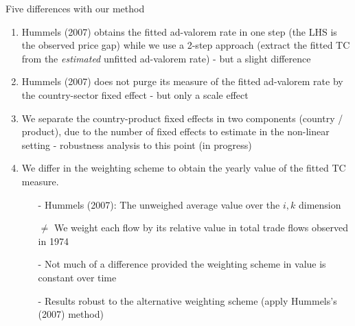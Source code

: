 \documentclass[10 pt,Helvetica, french]{beamer}
\begin{document}
\begin{frame}[label = app_compeffects_Hummels2]
Five differences with our method  \vspace{0.1cm}
\footnotesize
\begin{enumerate}

\item Hummels (2007) obtains the fitted ad-valorem rate in one step (the LHS is the observed price gap) while we use a 2-step approach (extract the fitted TC from the \textit{estimated} unfitted ad-valorem rate) - but a slight difference \vspace{0.1cm}
\item Hummels (2007) does not purge its measure of the fitted ad-valorem rate by the country-sector fixed effect  - but only a scale effect \vspace{0.1cm}
\item We separate the country-product fixed effects in two components (country / product), due to the number of fixed effects to estimate in the non-linear setting - robustness analysis to this point (in progress) \vspace{0.1cm}
\item We differ in the weighting scheme to obtain the yearly value of the fitted TC measure.  \vspace{0.1cm}
\begin{itemize}
\footnotesize
\item[-] Hummels (2007): The unweighed average value over the $i,k$ dimension \vspace{0.1cm}
\item[$\neq$] We weight each flow by its relative value in total trade flows observed in 1974 \vspace{0.1cm}
\item[-] Not much of a difference provided the weighting scheme in value is constant over time \vspace{0.1cm}
\item[-] Results robust to the alternative weighting scheme (apply Hummels's (2007) method) 
\end{itemize}

\end{enumerate}
\normalsize

\end{frame}
\end{document}
